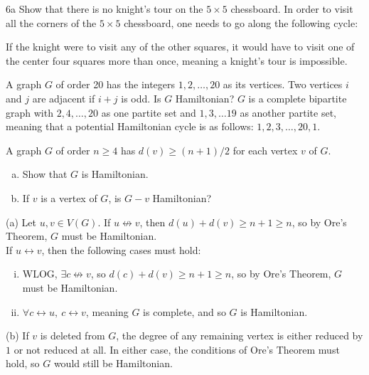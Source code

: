 \documentclass[10pt]{extarticle}
\title{}
\author{Avinash Iyer}
\date{}
\begin{document}
  \begin{problem}{6a}
    Show that there is no knight's tour on the $5\times 5$ chessboard.
    \tcblower
    In order to visit all the corners of the $5\times 5$ chessboard, one needs to go along the following cycle:
    \begin{center}
    \end{center}
    If the knight were to visit any of the other squares, it would have to visit one of the center four squares more than once, meaning a knight's tour is impossible.
  \end{problem}
  \begin{problem}{9}
    A graph $G$ of order 20 has the integers $1,2,\dots,20$ as its vertices. Two vertices $i$ and $j$ are adjacent if $i+j$ is odd. Is $G$ Hamiltonian?
    \tcblower
    $G$ is a complete bipartite graph with $2,4,\dots,20$ as one partite set and $1,3,\dots 19$ as another partite set, meaning that a potential Hamiltonian cycle is as follows: $1,2,3,\dots,20,1$.
  \end{problem}
  \begin{problem}{10}
    A graph $G$ of order $n\geq 4$ has $d(v) \geq (n+1)/2$ for each vertex $v$ of $G$.
    \begin{enumerate}[(a)]
      \item Show that $G$ is Hamiltonian.
      \item If $v$ is a vertex of $G$, is $G-v$ Hamiltonian?
    \end{enumerate}
    \tcblower
    \begin{problem}{(a)}
      Let $u,v\in V(G)$. If $u\not\leftrightarrow v$, then $d(u) + d(v) \geq n+1 \geq n$, so by Ore's Theorem, $G$ must be Hamiltonian.\\

      If $u\leftrightarrow v$, then the following cases must hold:
      \begin{enumerate}[(i)]
        \item WLOG, $\exists c\not\leftrightarrow v$, so $d(c) + d(v) \geq n+1 \geq n$, so by Ore's Theorem, $G$ must be Hamiltonian.
        \item $\forall c\leftrightarrow u,~c\leftrightarrow v$, meaning $G$ is complete, and so $G$ is Hamiltonian.
      \end{enumerate}
    \end{problem}
    \begin{problem}{(b)}
      If $v$ is deleted from $G$, the degree of any remaining vertex is either reduced by $1$ or not reduced at all. In either case, the conditions of Ore's Theorem must hold, so $G$ would still be Hamiltonian.
    \end{problem}
  \end{problem}
\end{document}
